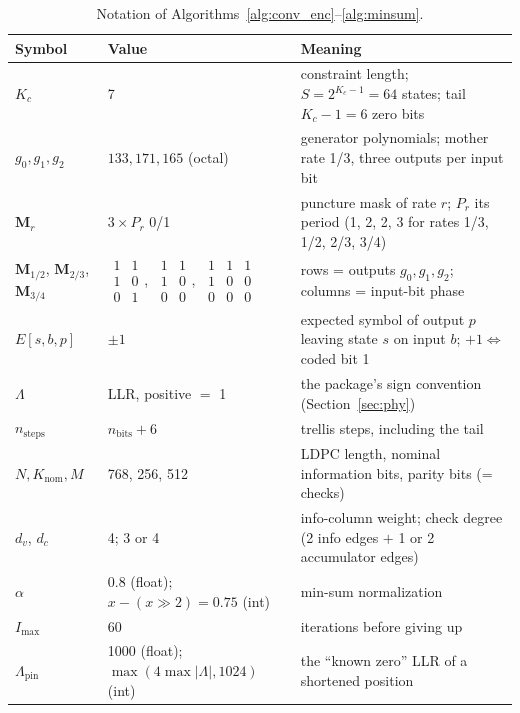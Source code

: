 \begin{table}[H]
    \centering
    \caption{Notation of Algorithms~\ref{alg:conv_enc}--\ref{alg:minsum}.}
    \label{tab:dec_notation}
    \small
    \begin{tabular}{@{}lp{4.4cm}p{7.6cm}@{}}
    \toprule
    \textbf{Symbol} & \textbf{Value} & \textbf{Meaning} \\
    \midrule
    $K_c$ & 7 & constraint length; $S = 2^{K_c - 1} = 64$ states; tail $K_c - 1 = 6$ zero bits \\
    $g_0, g_1, g_2$ & $133, 171, 165$ (octal) & generator polynomials; mother rate 1/3, three outputs per input bit \\
    $\mathbf{M}_r$ & $3 \times P_r$ 0/1 & puncture mask of rate $r$; $P_r$ its period (1, 2, 2, 3 for rates 1/3, 1/2, 2/3, 3/4) \\
    $\mathbf{M}_{1/2}$, $\mathbf{M}_{2/3}$, $\mathbf{M}_{3/4}$ & $\begin{smallmatrix}1&1\\1&0\\0&1\end{smallmatrix}$,\ $\begin{smallmatrix}1&1\\1&0\\0&0\end{smallmatrix}$,\ $\begin{smallmatrix}1&1&1\\1&0&0\\0&0&0\end{smallmatrix}$ & rows = outputs $g_0, g_1, g_2$; columns = input-bit phase \\
    $E[s, b, p]$ & $\pm 1$ & expected symbol of output $p$ leaving state $s$ on input $b$; $+1 \Leftrightarrow$ coded bit 1 \\
    $\Lambda$ & LLR, positive $=$ 1 & the package's sign convention (Section~\ref{sec:phy}) \\
    $n_{\mathrm{steps}}$ & $n_{\mathrm{bits}} + 6$ & trellis steps, including the tail \\
    $N, K_{\mathrm{nom}}, M$ & 768, 256, 512 & LDPC length, nominal information bits, parity bits (= checks) \\
    $d_v$, $d_c$ & 4; 3 or 4 & info-column weight; check degree (2 info edges $+$ 1 or 2 accumulator edges) \\
    $\alpha$ & 0.8 (float); $x - (x \gg 2) = 0.75$ (int) & min-sum normalization \\
    $I_{\max}$ & 60 & iterations before giving up \\
    $\Lambda_{\mathrm{pin}}$ & 1000 (float); $\max(4 \max|\Lambda|, 1024)$ (int) & the ``known zero'' LLR of a shortened position \\
    \bottomrule
    \end{tabular}
\end{table}


